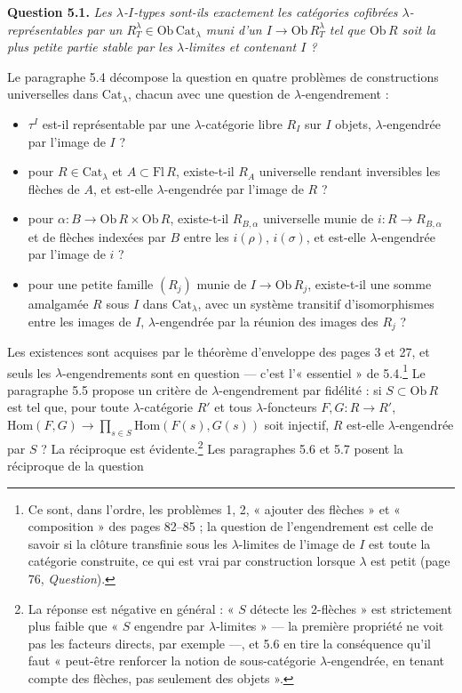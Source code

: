 \documentclass[11pt,a4paper]{article}
\begin{document}
\textbf{Question 5.1.} \emph{Les $\lambda$-$I$-types sont-ils exactement les
catégories cofibrées $\lambda$-représentables par un $R^{\lambda}_{T} \in
\mathrm{Ob}\,\mathrm{Cat}_{\lambda}$ muni d'un $I \to \mathrm{Ob}\,R^{\lambda}_{T}$
tel que $\mathrm{Ob}\,R$ soit la plus petite partie stable par les
$\lambda$-limites et contenant $I$ ?}

Le paragraphe 5.4 décompose la question en quatre problèmes de
constructions universelles dans $\mathrm{Cat}_{\lambda}$, chacun avec une
question de $\lambda$-engendrement :
\begin{itemize}
\item[a')] $\tau^{I}$ est-il représentable par une $\lambda$-catégorie
libre $R_{I}$ sur $I$ objets, $\lambda$-engendrée par l'image de $I$ ?
\item[b')] pour $R \in \mathrm{Cat}_{\lambda}$ et $A \subset \mathrm{Fl}\,R$,
existe-t-il $R_{A}$ universelle rendant inversibles les flèches de $A$, et
est-elle $\lambda$-engendrée par l'image de $R$ ?
\item[c')] pour $\alpha : B \to \mathrm{Ob}\,R \times \mathrm{Ob}\,R$,
existe-t-il $R_{B,\alpha}$ universelle munie de $i : R \to R_{B,\alpha}$ et
de flèches indexées par $B$ entre les $i(\rho)$, $i(\sigma)$, et est-elle
$\lambda$-engendrée par l'image de $i$ ?
\item[d')] pour une petite famille $(R_{j})$ munie de $I \to \mathrm{Ob}\,
R_{j}$, existe-t-il une somme amalgamée $R$ sous $I$ dans $\mathrm{Cat}_{
\lambda}$, avec un système transitif d'isomorphismes entre les images de
$I$, $\lambda$-engendrée par la réunion des images des $R_{j}$ ?
\end{itemize}
Les existences sont acquises par le théorème d'enveloppe des pages 3 et
27, et seuls les $\lambda$-engendrements sont en question — c'est
l'« essentiel » de 5.4.\footnote{Ce sont, dans l'ordre, les problèmes 1,
2, « ajouter des flèches » et « composition » des pages 82--85 ; la
question de l'engendrement est celle de savoir si la clôture transfinie
sous les $\lambda$-limites de l'image de $I$ est toute la catégorie
construite, ce qui est vrai par construction lorsque $\lambda$ est petit
(page 76, \emph{Question}).} Le paragraphe 5.5 propose un critère de
$\lambda$-engendrement par fidélité : si $S \subset \mathrm{Ob}\,R$ est tel
que, pour toute $\lambda$-catégorie $R'$ et tous $\lambda$-foncteurs $F, G :
R \to R'$, $\mathrm{Hom}(F, G) \to \prod_{s \in S} \mathrm{Hom}(F(s), G(s))$
soit injectif, $R$ est-elle $\lambda$-engendrée par $S$ ? La réciproque
est évidente.\footnote{La réponse est négative en général : « $S$
détecte les 2-flèches » est strictement plus faible que « $S$ engendre
par $\lambda$-limites » — la première propriété ne voit pas les
facteurs directs, par exemple —, et 5.6 en tire la conséquence qu'il
faut « peut-être renforcer la notion de sous-catégorie
$\lambda$-engendrée, en tenant compte des flèches, pas seulement des
objets ».} Les paragraphes 5.6 et 5.7 posent la réciproque de la question
\end{document}
